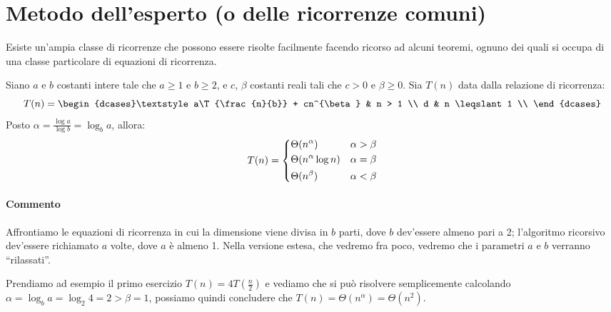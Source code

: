 \clearpage
\section{Metodo dell'esperto (o delle ricorrenze comuni)}

Esiste un'ampia classe di ricorrenze che possono essere risolte facilmente facendo ricorso ad alcuni teoremi, ognuno dei quali si occupa di una classe particolare di equazioni di ricorrenza.

\begin{theorem}
Siano \(a\) e \(b\) costanti intere tale che \(a \geqslant 1\) e \(b \geqslant 2\), e \(c\), \(\beta\) costanti reali tali che \(c > 0\) e \(\beta \geqslant 0\).
Sia \(T(n)\) data dalla relazione di ricorrenza:
\[
	T(n) =
	\begin{dcases}\textstyle
		a\T{\frac{n}{b}} + cn^{\beta} & n > 1 \\
		d & n \leqslant 1 \\
	\end{dcases}
\]
Posto \(\alpha = \frac{\log a}{\log b} = \log_{b} a\), allora:
\[
	T(n) =
	\begin{dcases}
		\Theta(n^{\alpha}) & \alpha > \beta \\
		\Theta(n^{\alpha}\log n) & \alpha = \beta \\
		\Theta(n^{\beta}) & \alpha < \beta \\
	\end{dcases}
\]
\end{theorem}

\paragraph{Commento}
Affrontiamo le equazioni di ricorrenza in cui la dimensione viene divisa in \(b\) parti, dove \(b\) dev'essere almeno pari a 2; l'algoritmo ricorsivo dev'essere richiamato \(a\) volte, dove \(a\) è almeno 1.
Nella versione estesa, che vedremo fra poco, vedremo che i parametri \(a\) e \(b\) verranno \enquote{rilassati}.

Prendiamo ad esempio il primo esercizio \(T(n) = 4T(\frac{n}{2})\) e vediamo che si può risolvere semplicemente calcolando \(\alpha = \log_b a = \log_2 4 = 2 > \beta = 1\), possiamo quindi concludere che \(T(n) = \Theta(n^{\alpha}) = \Theta(n^2)\).

